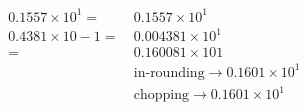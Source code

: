 \documentclass[pdflatex,compress]{beamer}
\begin{document}
	\begin{frame}
		\begin{align*}
			0.1557 \times 10^1 =&~ 0.1557 \times 10^1 \\
			0.4381 \times 10-1 =&~ 0.004381 \times 10^1 \\
			=&~ 0.160081 × 101 &\\
			&~\text{in-rounding} \rightarrow  0.1601 \times 10^1 \\
			&~\text{chopping} \rightarrow  0.1601 \times 10^1 \\
		\end{align*}
	\end{frame}
\end{document}

